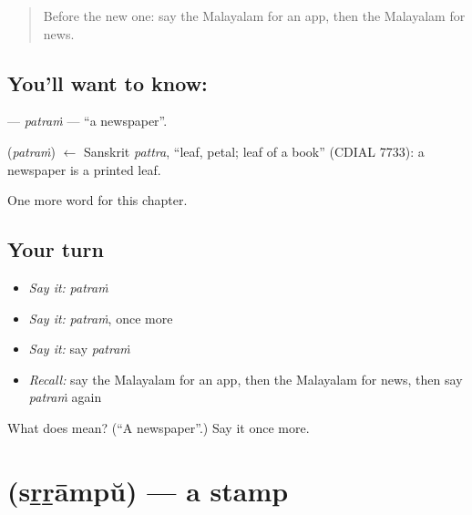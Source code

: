 \label{lesson:ML-C250-patram}



\begin{quote}
Before the new one: say the Malayalam for an app, then the Malayalam for news.
\end{quote}

\subsection*{You'll want to know: }
\textbf{} — \emph{patraṁ} — \textquotedblleft{}a newspaper\textquotedblright{}.

\begin{cousinweb}
\textbf{} (\emph{patraṁ}) $\leftarrow$ Sanskrit \emph{pattra}, \textquotedblleft{}leaf, petal; leaf of a book\textquotedblright{} (CDIAL 7733): a newspaper is a printed leaf.
\end{cousinweb}

\begin{grammarlens}[title={What you've built}]
One more word for this chapter.
\end{grammarlens}

\subsection*{Your turn}
\begin{itemize}
\raggedright
  \item \emph{Say it:} \emph{patraṁ}
  \item \emph{Say it:} \emph{patraṁ}, once more
  \item \emph{Say it:} say \emph{patraṁ}
  \item \emph{Recall:} say the Malayalam for an app, then the Malayalam for news, then say \emph{patraṁ} again
\end{itemize}

\begin{tcolorbox}[breakable,colback=teal!4,colframe=teal!35!black,title={Before you move on}]
What does  mean? (\textquotedblleft{}A newspaper\textquotedblright{}.) Say it once more.
\end{tcolorbox}
\section[\texorpdfstring{\ml{സ്റ്റാമ്പ്} (sṟṟāmpŭ)}{സ്റ്റാമ്പ് (sṟṟāmpŭ)}]{ (sṟṟāmpŭ) — a stamp}

\label{lesson:ML-C250-srrampu}



